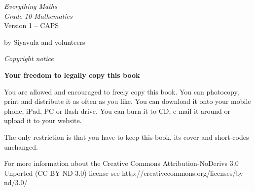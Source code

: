 
\begin{titlepage}
\begin{adjustwidth}{1in}{1in}
\begin{center}
    \thispagestyle{empty}

    \vspace*{4in}

    {
    {\normalfont\sffamily\fontsize{36}\normalfont\itshape{Everything Maths } \\ \vspace*{1cm}
     \normalfont\sffamily\fontsize{22}\normalfont\itshape{Grade 10 Mathematics}}
    \vspace*{1in} \\
    \LARGE Version 1 -- CAPS \\

   {\vspace*{2in}
     by Siyavula and volunteers 
  

\vfill

    }}
\end{center}
\end{adjustwidth}
\end{titlepage}






\newpage
\thispagestyle{empty}
\begin{center}
\normalfont\sffamily\fontsize{22}\normalfont\itshape Copyright notice\\

\vspace*{1in}

\textbf{Your freedom to legally copy this book}\\

\end{center}


{\LARGE
You are allowed and encouraged to freely copy this book. You can photocopy, print and distribute it as
often as you like. You can download it onto your mobile phone, iPad, PC or flash drive. You can burn it
to CD, e-mail it around or upload it to your website. \par

The only restriction is that you have to keep this book, its cover and short-codes unchanged.\par

For more information about the Creative Commons Attribution-NoDerivs 3.0 Unported (CC BY-ND
3.0) license see http://creativecommons.org/licenses/by-nd/3.0/}\\

